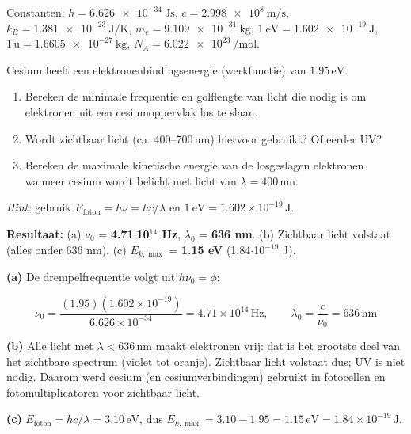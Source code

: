 
Constanten: $h = \SI{6.626e-34}{\joule\second}$, $c = \SI{2.998e8}{\metre\per\second}$, $k_B = \SI{1.381e-23}{\joule\per\kelvin}$, $m_e = \SI{9.109e-31}{\kilogram}$, $\SI{1}{\electronvolt} = \SI{1.602e-19}{\joule}$, $1\,\mathrm{u} = \SI{1.6605e-27}{\kilogram}$, $N_A = \SI{6.022e23}{\per\mole}$.

\begin{oefening}
Cesium heeft een elektronenbindingsenergie (werkfunctie) van \(1.95\,\mathrm{eV}\).

\begin{enumerate}
\item[(a)]
  Bereken de minimale frequentie en golflengte van licht die nodig is om elektronen uit een cesiumoppervlak los te slaan.
\item[(b)]
  Wordt zichtbaar licht (ca. \(400\)--\(700\,\mathrm{nm}\)) hiervoor gebruikt? Of eerder UV?
\item[(c)]
  Bereken de maximale kinetische energie van de losgeslagen elektronen wanneer cesium wordt belicht met licht van \(\lambda = 400\,\mathrm{nm}\).
\end{enumerate}

\emph{Hint:} gebruik \(E_{\text{foton}} = h\nu = hc/\lambda\) en \(1~\mathrm{eV} = 1.602\times10^{-19}\,\mathrm{J}\).
\end{oefening}
\begin{oplossing}
\textbf{Resultaat:} (a) \(\nu_0\) = \textbf{4.71\ensuremath{\cdot{}}10\ensuremath{^{14}} Hz}, \(\lambda_0\) = \textbf{636 nm}. (b) Zichtbaar licht volstaat (alles onder 636 nm). (c) \(E_{k,\max}\) = \textbf{1.15 eV} (1.84\ensuremath{\cdot{}}10\ensuremath{^{-19}} J).

\textbf{(a)} De drempelfrequentie volgt uit \(h\nu_0 = \phi\):

\[
\nu_0 = \frac{(1.95)(1.602\times10^{-19})}{6.626\times10^{-34}} = 4.71\times10^{14}\,\mathrm{Hz}, \qquad \lambda_0 = \frac{c}{\nu_0} = 636\,\mathrm{nm}
\]

\textbf{(b)} Alle licht met \(\lambda < 636\,\mathrm{nm}\) maakt elektronen vrij: dat is het grootste deel van het zichtbare spectrum (violet tot oranje). Zichtbaar licht volstaat dus; UV is niet nodig. Daarom werd cesium (en cesiumverbindingen) gebruikt in fotocellen en fotomultiplicatoren voor zichtbaar licht.

\textbf{(c)} \(E_{\text{foton}} = hc/\lambda = 3.10\,\mathrm{eV}\), dus \(E_{k,\max} = 3.10 - 1.95 = 1.15\,\mathrm{eV} = 1.84\times10^{-19}\,\mathrm{J}\).
\end{oplossing}

